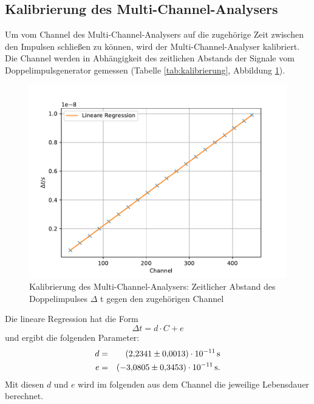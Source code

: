 \subsection{Kalibrierung des Multi-Channel-Analysers}
Um vom Channel des Multi-Channel-Analysers auf die zugehörige Zeit zwischen den Impulsen schließen zu können, wird der Multi-Channel-Analyser kalibriert.
Die Channel werden in Abhängigkeit des zeitlichen Abstands der Signale vom Doppelimpulsgenerator gemessen (Tabelle \ref{tab:kalibrierung}, Abbildung \ref{fig:kalibrierung}).

\begin{figure}[h!]
  \centering
  \includegraphics[width=\textwidth]{figkalibrierung.pdf}
  \caption{Kalibrierung des Multi-Channel-Analysers: Zeitlicher Abstand des Doppelimpulses $\Delta$ t gegen den zugehörigen Channel}
  \label{fig:kalibrierung}
\end{figure}
Die lineare Regression hat die Form
\begin{equation*}
  \Delta t = d \cdot C + e
\end{equation*}
und ergibt die folgenden Parameter:
\begin{align*}
  d  &=&  \SI{ 2.2341 \pm 0.0013 e-11}{s}  \\
  e  &=&  \SI{-3.0805 \pm 0.3453 e-11}{s}.  \\
\end{align*}
Mit diesen $d$ und $e$ wird im folgenden aus dem Channel die jeweilige Lebensdauer berechnet.
\FloatBarrier

